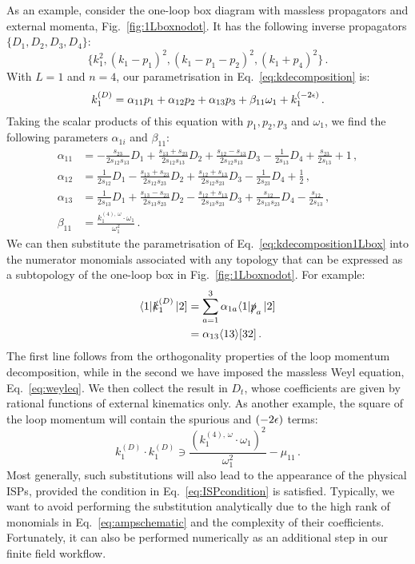 \documentclass[main.tex]{subfiles}
\begin{document}
As an example, consider the one-loop box diagram with massless propagators and external momenta, Fig.~\ref{fig:1Lboxnodot}. It has the following inverse propagators $\{D_1, D_2, D_3, D_4\}$:
\begin{equation} \label{eq:box1Lprops}
    \{k_1^2, (k_1-p_1)^2, (k_1-p_1-p_2)^2, (k_1+p_4)^2 \} \,.
\end{equation}
With $L=1$ and $n=4$, our parametrisation in Eq.~\ref{eq:kdecomposition} is:
\begin{equation} \label{eq:kdecomposition1Lbox}
    k_1^{(D)} = \alpha_{11} p_1 + \alpha_{12} p_2 + \alpha_{13} p_3 + \beta_{11} \omega_1 + k_1^{(-2\epsilon)}\,.
\end{equation}
Taking the scalar products of this equation with $p_1, p_2, p_3$ and $\omega_1$, we find the following parameters $\alpha_{1i}$ and $\beta_{11}$:
\begin{align}
    \alpha_{11} &= -\frac{s_{23}}{2 s_{12} s_{13}}D_1 +\frac{s_{13}+s_{23}}{2 s_{12} s_{13}}D_2 + \frac{s_{12}-s_{13}}{2 s_{12} s_{13}}D_3 -\frac{1}{2 s_{13}}D_4 +\frac{s_{23}}{2 s_{13}} + 1\,, \nonumber \\
    \alpha_{12} &= \frac{1}{2 s_{12}}D_1 -\frac{s_{13}+s_{23}}{2 s_{12} s_{23}}D_2 + \frac{s_{12}+s_{13}}{2 s_{12} s_{23}}D_3 -\frac{1}{2 s_{23}} D_4 +\frac{1}{2}\,, \nonumber \\
    \alpha_{13} &= \frac{1}{2 s_{13}}D_1 +\frac{s_{13}-s_{23}}{2 s_{13} s_{23}}D_2 - \frac{s_{12}+s_{13}}{2 s_{13} s_{23}}D_3 +\frac{s_{12}}{2 s_{13} s_{23}} D_4 -\frac{s_{12}}{2 s_{13}}\,, \nonumber \\
    \beta_{11} &= \frac{k_1^{(4),\, \omega} \cdot \omega_1}{\omega_1^2}\,.
\end{align}
We can then substitute the parametrisation of Eq.~\ref{eq:kdecomposition1Lbox} into the numerator monomials associated with any topology that can be expressed as a subtopology of the one-loop box in Fig.~\ref{fig:1Lboxnodot}. For example:
\begin{align}
    \langle 1|\slashed{k}_1^{(D)}\left| 2 \right] &= \sum_{a=1}^3 \alpha_{1a} \langle 1|\slashed{p}_a\left| 2 \right] \nonumber \\
    &= \alpha_{13} \langle 13 \rangle[ 32 ] \,.
\end{align}
The first line follows from the orthogonality properties of the loop momentum decomposition, while in the second we have imposed the massless Weyl equation, Eq.~\ref{eq:weyleq}. We then collect the result in $D_t$, whose coefficients are given by rational functions of external kinematics only. As another example, the square of the loop momentum will contain the spurious and $(-2\epsilon)$ terms:
\begin{equation}
    k_1^{(D)} \cdot k_1^{(D)} \ni \frac{(k_1^{(4),\, \omega} \cdot \omega_1)^2}{\omega_1^2} - \mu_{11}\,.
\end{equation}
Most generally, such substitutions will also lead to the appearance of the physical ISPs, provided the condition in Eq.~\ref{eq:ISPcondition} is satisfied. Typically, we want to avoid performing the substitution analytically due to the high rank of monomials in Eq.~\ref{eq:ampschematic} and the complexity of their coefficients. Fortunately, it can also be performed numerically as an additional step in our finite field workflow.
\end{document}
